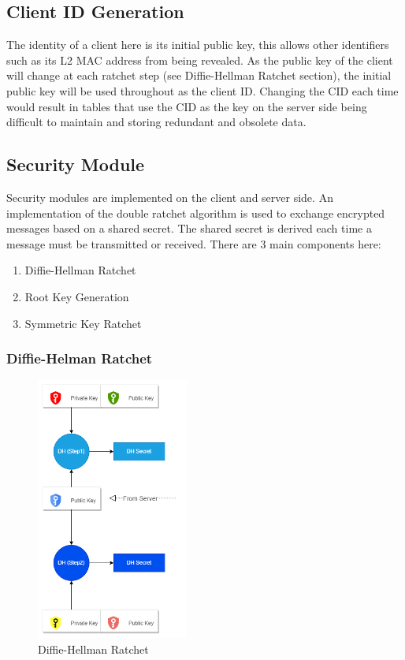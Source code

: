 \subsection{Client ID Generation}

The identity of a client here is its initial public key, this allows other identifiers such as its L2 MAC address from being revealed. As the public key of the client will change at each ratchet step (see Diffie-Hellman Ratchet section), the initial public key will be used throughout as the client ID. Changing the CID each time would result in tables that use the CID as the key on the server side being difficult to maintain and storing redundant and obsolete data.

\subsection{Security Module}

Security modules are implemented on the client and server side. An implementation of the double ratchet algorithm is used to exchange encrypted messages based on a shared secret. The shared secret is derived each time a message must be transmitted or received. There are 3 main components here:
\begin{enumerate}
    \item Diffie-Hellman Ratchet
    \item Root Key Generation
    \item Symmetric Key Ratchet
\end{enumerate}

\subsubsection{Diffie-Helman Ratchet}

\begin{figure}[ht!]
\centering
\includegraphics[width= 50mm]{./images/security_overview1-Diffie-Hellman Ratchet.png}
\caption{Diffie-Hellman Ratchet}
\end{figure}

